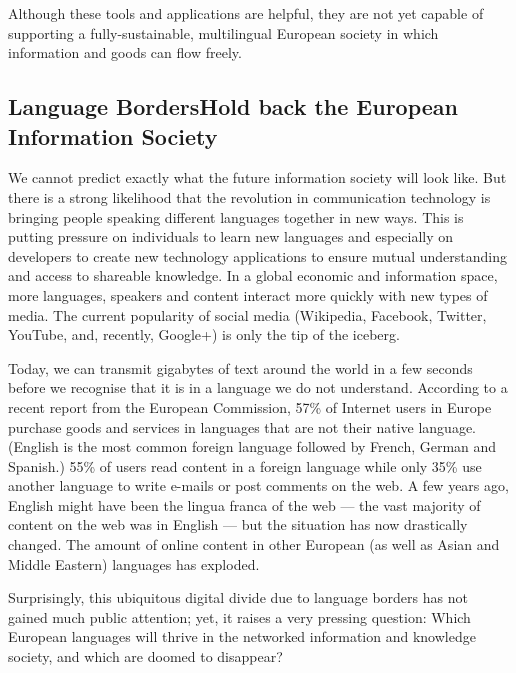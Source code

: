 \begin{multicols}{2}
Although these tools and applications are helpful, they are not yet capable of supporting a fully-sustainable, multilingual European society in which information and goods can flow freely.

\subsection[Language Borders Hold back the European Information Society]{Language Borders\newline Hold back the European Information Society}

We cannot predict exactly what the future information society will look like. But there is a strong likelihood that the revolution in communication technology is bringing people speaking different languages together in new ways. This is putting pressure on individuals to learn new languages and especially on developers to create new technology applications to ensure mutual understanding and access to shareable knowledge. In a global economic and information space, more languages, speakers and content interact more quickly with new types of media. The current popularity of social media (Wikipedia, Facebook, Twitter, YouTube, and, recently, Google+) is only the tip of the iceberg.


Today, we can transmit gigabytes of text around the world in a few seconds before we recognise that it is in a language we do not understand. According to a recent report from the European Commission, 57\% of Internet users in Europe purchase goods and services in languages that are not their native language. (English is the most common foreign language followed by French, German and Spanish.) 55\% of users read content in a foreign language while only 35\% use another language to write e-mails or post comments on the web\cite{EC1}. A few years ago, English might have been the lingua franca of the web — the vast majority of content on the web was in English — but the situation has now drastically changed. The amount of online content in other European (as well as Asian and Middle Eastern) languages has exploded.

Surprisingly, this ubiquitous digital divide due to language borders has not gained much public attention; yet, it raises a very pressing question: Which European languages will thrive in the networked information and knowledge society, and which are doomed to disappear?


\end{multicols}
